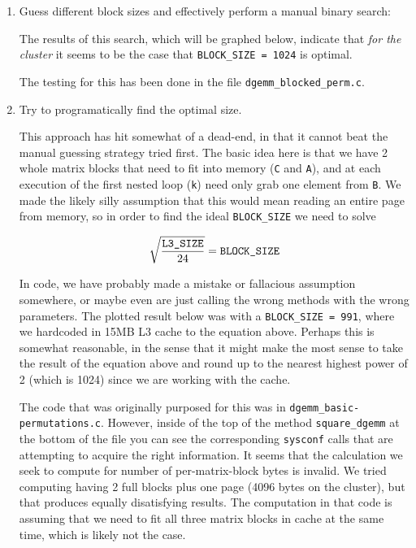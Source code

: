 \documentclass[11pt]{article}
\begin{document}
\begin{enumerate}
    \item Guess different block sizes and effectively perform a manual binary search:

    The results of this search, which will be graphed below, indicate that \emph{for the cluster} it seems to be the case that \texttt{BLOCK\_SIZE = 1024} is optimal.

    The testing for this has been done in the file \texttt{dgemm\_blocked\_perm.c}.

    \item Try to programatically find the optimal size.

    This approach has hit somewhat of a dead-end, in that it cannot beat the manual guessing strategy tried first.  The basic idea here is that we have 2 whole matrix blocks that need to fit into memory (\texttt{C} and \texttt{A}), and at each execution of the first nested loop (\texttt{k}) need only grab one element from \texttt{B}.  We made the likely silly assumption that this would mean reading an entire page from memory, so in order to find the ideal \texttt{BLOCK\_SIZE} we need to solve

    $$
    \sqrt{\frac{\text{\ttfamily L3\_SIZE}}{24}} = \text{\ttfamily BLOCK\_SIZE}
    $$

    In code, we have probably made a mistake or fallacious assumption somewhere, or maybe even are just calling the wrong methods with the wrong parameters.  The plotted result below was with a \texttt{BLOCK\_SIZE = 991}, where we hardcoded in 15MB L3 cache to the equation above.  Perhaps this is somewhat reasonable, in the sense that it might make the most sense to take the result of the equation above and round up to the nearest highest power of 2 (which is 1024) since we are working with the cache.

    \noindent The code that was originally purposed for this was in \texttt{dgemm\_basic-permutations.c}.  However, inside of the top of the method \texttt{square\_dgemm} at the bottom of the file you can see the corresponding \texttt{sysconf} calls that are attempting to acquire the right information.  It seems that the calculation we seek to compute for number of per-matrix-block bytes is invalid.  We tried computing having 2 full blocks plus one page (4096 bytes on the cluster), but that produces equally disatisfying results.  The computation in that code is assuming that we need to fit all three matrix blocks in cache at the same time, which is likely not the case.
\end{enumerate}
\end{document}

